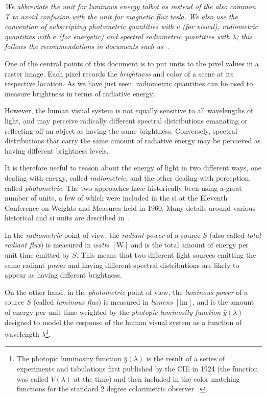 \begin{table}
{}
\vskip 1mm
{\footnotesize\it We abbreviate the unit for luminous energy \textit{talbot} as
\si{\talbot} instead of the also common \si{\tesla} to avoid confusion with the
unit for magnetic flux \textit{tesla}.
We also use the convention of subscripting photometric quantities
with $v$ (for \textit{visual}), radiometric quantities with $e$ (for
\textit{energetic}) and spectral radiometric quantities with $\lambda$;
this follows the recommendations in documents such as~\cite{united1967usa}.}
\end{table}

One of the central points of this document is to put units to the pixel
values in a raster image. Each pixel records the \textsl{\gls{brightness}} and color
of a scene at its respective location. As we have just seen, radiometric
quantities can be used to measure brightness in terms of radiative energy.

However, the human visual system is not equally sensitive to all wavelengths
of light, and may perceive radically different spectral
distributions emanating or reflecting off an object as having the same
brightness. Conversely, spectral distributions that carry the same amount
of radiative energy may be percieved as having different brightness levels.

It is therefore useful to reason about the energy of light in two
different ways, one dealing with energy, called \textsl{radiometric}, and the
other dealing with perception, called \textsl{photometric}. The two approaches
have historically been using a great number of units, a few of which were
included in the \gls{si} at the Eleventh Conference on Weights and Measures
held in 1960.  Many details around various historical and \gls{si} units are
described in~\cite{Meyer-Arendt:68}.

In the \textsl{radiometric} point of view, the \textsl{radiant power} of a
source $S$
(also called \textsl{total radiant flux}) is measured in
\textit{watts} $[\si{\watt}]$ and is the total amount of energy per unit time
emitted by $S$.
This means that two different light sources emitting the same radiant power and
having different spectral distributions are likely to appear as having different
brightness.

On the other hand, in the \textsl{photometric} point of view, the
\textsl{luminous power}
of a source $S$ (called \textsl{luminous flux}) is measured in
\textit{lumens} $[\si{\lumen}]$, and is the amount of energy per unit time
weighted
by the \textit{photopic luminosity function} $\bar y(\lambda)$ designed to
model the response of the human visual system as a function of 
wavelength $\lambda$\footnote{The photopic luminosity function $\bar y(\lambda)$ is
the result of a series of experiments and tabulations first published
by the \gls{CIE} in 1924 (the function was called $V(\lambda)$ at the time)
and then included in the color matching functions for the standard 2 degree
colorimetric observer~\citep{cie1931}.}.

